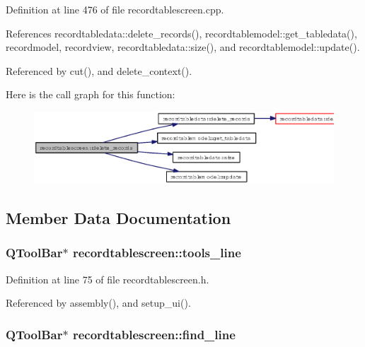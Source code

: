 Definition at line 476 of file recordtablescreen.cpp.

References recordtabledata::delete\_\-records(), recordtablemodel::get\_\-tabledata(), recordmodel, recordview, recordtabledata::size(), and recordtablemodel::update().

Referenced by cut(), and delete\_\-context().

Here is the call graph for this function:\begin{figure}[H]
\begin{center}
\leavevmode
\includegraphics[width=332pt]{classrecordtablescreen_91d1bc4b540ad9af78437a59143e94a4_cgraph}
\end{center}
\end{figure}


\subsection{Member Data Documentation}
\subsubsection{\setlength{\rightskip}{0pt plus 5cm}QTool\-Bar$\ast$ {\bf recordtablescreen::tools\_\-line}\hspace{0.3cm}{\tt  [private]}}\label{classrecordtablescreen_4d12482b6d9a926f84b8095c1ca37683}




Definition at line 75 of file recordtablescreen.h.

Referenced by assembly(), and setup\_\-ui().
\subsubsection{\setlength{\rightskip}{0pt plus 5cm}QTool\-Bar$\ast$ {\bf recordtablescreen::find\_\-line}\hspace{0.3cm}{\tt  [private]}}\label{classrecordtablescreen_79b4c677242dc0bbbf118bc7674c9d39}




